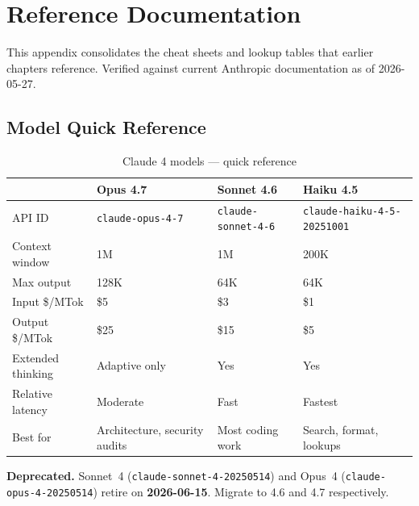 \chapter{Reference Documentation}
\label{app:reference}

This appendix consolidates the cheat sheets and lookup tables that earlier
chapters reference. Verified against current Anthropic documentation as of
2026-05-27.

\section{Model Quick Reference}
\label{app:model-ref}

\begin{table}[ht]
\centering
\caption{Claude 4 models — quick reference}
\label{tab:app-models}
\begin{tabularx}{\textwidth}{Xlll}
\toprule
                       & \textbf{Opus 4.7}              & \textbf{Sonnet 4.6}             & \textbf{Haiku 4.5} \\
\midrule
API ID                 & \texttt{claude-opus-4-7}       & \texttt{claude-sonnet-4-6}      & \texttt{claude-haiku-4-5-20251001} \\
Context window         & 1M                              & 1M                              & 200K \\
Max output             & 128K                            & 64K                             & 64K \\
Input \$/MTok          & \$5                             & \$3                             & \$1 \\
Output \$/MTok         & \$25                            & \$15                            & \$5 \\
Extended thinking      & Adaptive only                   & Yes                             & Yes \\
Relative latency       & Moderate                        & Fast                            & Fastest \\
Best for               & Architecture, security audits   & Most coding work                 & Search, format, lookups \\
\bottomrule
\end{tabularx}
\end{table}

\textbf{Deprecated.} Sonnet~4 (\texttt{claude-sonnet-4-20250514}) and Opus~4
(\texttt{claude-opus-4-20250514}) retire on \textbf{2026-06-15}. Migrate to
4.6 and 4.7 respectively.

